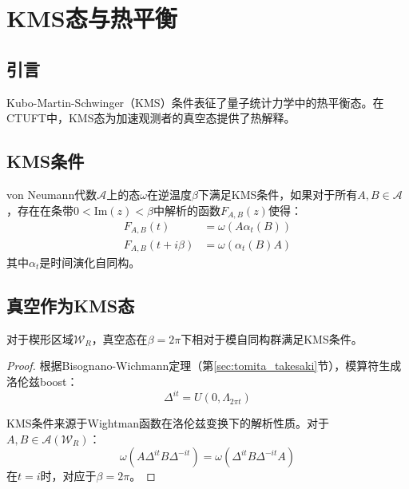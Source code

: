 \section{KMS态与热平衡}
\label{sec:kms}

\subsection{引言}

Kubo-Martin-Schwinger（KMS）条件表征了量子统计力学中的热平衡态。在CTUFT中，KMS态为加速观测者的真空态提供了热解释。

\subsection{KMS条件}

\begin{definition}[KMS条件]
von Neumann代数$\mathcal{A}$上的态$\omega$在逆温度$\beta$下满足KMS条件，如果对于所有$A, B \in \mathcal{A}$，存在在条带$0 < \text{Im}(z) < \beta$中解析的函数$F_{A,B}(z)$使得：
\begin{align}
    F_{A,B}(t) &= \omega(A \alpha_t(B)) \\
    F_{A,B}(t + i\beta) &= \omega(\alpha_t(B) A)
\end{align}
其中$\alpha_t$是时间演化自同构。
\end{definition}

\subsection{真空作为KMS态}

\begin{theorem}[真空的KMS性质]
对于楔形区域$\mathcal{W}_R$，真空态在$\beta = 2\pi$下相对于模自同构群满足KMS条件。
\end{theorem}

\begin{proof}
根据Bisognano-Wichmann定理（第\ref{sec:tomita_takesaki}节），模算符生成洛伦兹boost：
\begin{equation}
    \Delta^{it} = U(0, \Lambda_{2\pi t})
\end{equation}

KMS条件来源于Wightman函数在洛伦兹变换下的解析性质。对于$A, B \in \mathcal{A}(\mathcal{W}_R)$：
\begin{equation}
    \omega(A \Delta^{it} B \Delta^{-it}) = \omega(\Delta^{it} B \Delta^{-it} A)
\end{equation}
在$t = i$时，对应于$\beta = 2\pi$。
\end{proof}

